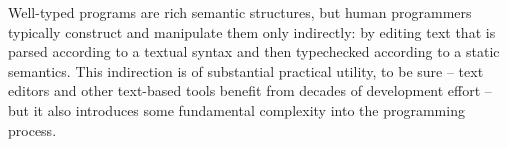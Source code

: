 






Well-typed programs are rich semantic structures, but human programmers typically construct and manipulate them only indirectly: by editing text that is parsed according to a textual syntax and then typechecked according to a static semantics. This indirection is of substantial practical utility, to be sure -- text editors and other text-based tools benefit from decades of development effort -- but it also introduces some fundamental complexity into the programming process. 

